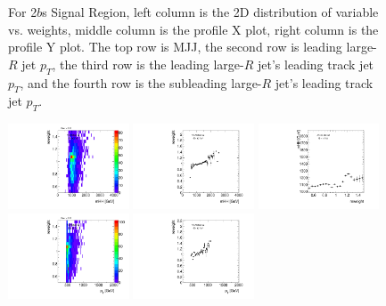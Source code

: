\begin{figure}[htbp!]
\begin{center}
\caption{For 2$b$s Signal Region, left column is the 2D distribution of variable vs. weights, middle column is the profile X plot, right column is the profile Y plot. The top row is MJJ, the second row is leading large-$R$ jet $p_{T}$, the third row is the leading large-$R$ jet's leading track jet $p_{T}$, and the fourth row is the subleading large-$R$ jet's leading track jet $p_{T}$.}
\label{fig:app-reweight-dist-2b-SR}
\end{center}
\end{figure}


\begin{figure}[htbp!]
\begin{center}
\includegraphics[angle=270, width=0.32\textwidth]{./figures/boosted/AppendixReweight/Weights/3Trk_Signal_mHH_l_weight.pdf}
\includegraphics[angle=270, width=0.32\textwidth]{./figures/boosted/AppendixReweight/Weights/3Trk_Signal_mHH_l_weight_profx.pdf}
\includegraphics[angle=270, width=0.32\textwidth]{./figures/boosted/AppendixReweight/Weights/3Trk_Signal_mHH_l_weight_profy.pdf}\\
\includegraphics[angle=270, width=0.32\textwidth]{./figures/boosted/AppendixReweight/Weights/3Trk_Signal_leadHCand_Pt_m_weight.pdf}
\includegraphics[angle=270, width=0.32\textwidth]{./figures/boosted/AppendixReweight/Weights/3Trk_Signal_leadHCand_Pt_m_weight_profx.pdf}

\end{center}
\end{figure}
